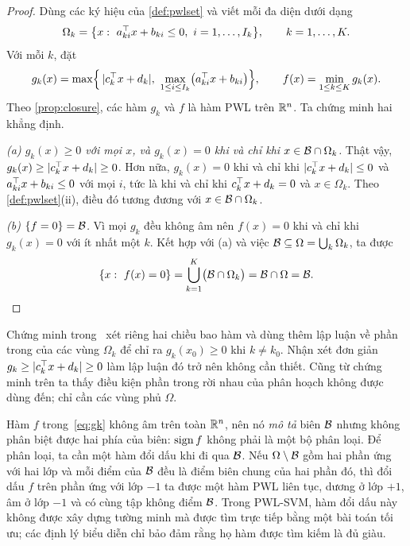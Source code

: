\begin{proof}
Dùng các ký hiệu của \cref{def:pwlset} và viết mỗi đa diện dưới dạng
\[
\Omega_k=\bigl\{x:\ a_{ki}^\T x+b_{ki}\le 0,\ i=1,\dots,I_k\bigr\},\qquad k=1,\dots,K .
\]
Với mỗi $k$, đặt
\begin{equation}\label{eq:gk}
g_k(x)=\max\Bigl\{\,|c_k^\top x+d_k|,\ \max_{1\le i\le I_k}\bigl(a_{ki}^\top x+b_{ki}\bigr)\Bigr\},
\qquad
f(x)=\min_{1\le k\le K} g_k(x).
\end{equation}
Theo \cref{prop:closure}, các hàm $g_k$ và $f$ là hàm PWL trên $\mathbb{R}^n$. Ta chứng minh hai khẳng định.

\emph{(a) $g_k(x)\ge0$ với mọi $x$, và $g_k(x)=0$ khi và chỉ khi $x\in\mathcal{B}\cap\Omega_k$.} Thật vậy, $g_k(x)\ge|c_k^\top x+d_k|\ge0$. Hơn nữa, $g_k(x)=0$ khi và chỉ khi $|c_k^\top x+d_k|\le0$ và $a_{ki}^\top x+b_{ki}\le0$ với mọi $i$, tức là khi và chỉ khi $c_k^\top x+d_k=0$ và $x\in\Omega_k$. Theo \cref{def:pwlset}(ii), điều đó tương đương với $x\in\mathcal{B}\cap\Omega_k$.

\emph{(b) $\{f=0\}=\mathcal{B}$.} Vì mọi $g_k$ đều không âm nên $f(x)=0$ khi và chỉ khi $g_k(x)=0$ với ít nhất một $k$. Kết hợp với (a) và việc $\mathcal{B}\subseteq\Omega=\bigcup_k\Omega_k$, ta được
\[
\{x:\ f(x)=0\}=\bigcup_{k=1}^{K}\bigl(\B\cap\Omega_k\bigr)=\B\cap\Omega=\B. \qedhere
\]
\end{proof}

\begin{remark}\label{rem:proof}
Chứng minh trong~\cite{huang2013} xét riêng hai chiều bao hàm và dùng thêm lập luận về phần trong của các vùng $\Omega_k$ để chỉ ra $g_k(x_0)\ge0$ khi $k\neq k_0$. Nhận xét đơn giản $g_k\ge|c_k^\top x+d_k|\ge0$ làm lập luận đó trở nên không cần thiết. Cũng từ chứng minh trên ta thấy điều kiện phần trong rời nhau của phân hoạch không được dùng đến; chỉ cần các vùng phủ $\Omega$.
\end{remark}

\begin{remark}\label{rem:nonneg}
Hàm $f$ trong~\eqref{eq:gk} không âm trên toàn $\mathbb{R}^n$, nên nó \emph{mô tả} biên $\mathcal{B}$ nhưng không phân biệt được hai phía của biên: $\operatorname{sign} f$ không phải là một bộ phân loại. Để phân loại, ta cần một hàm đổi dấu khi đi qua $\mathcal{B}$. Nếu $\Omega\setminus\mathcal{B}$ gồm hai phần ứng với hai lớp và mỗi điểm của $\mathcal{B}$ đều là điểm biên chung của hai phần đó, thì đổi dấu $f$ trên phần ứng với lớp $-1$ ta được một hàm PWL liên tục, dương ở lớp $+1$, âm ở lớp $-1$ và có cùng tập không điểm $\mathcal{B}$. Trong PWL-SVM, hàm đổi dấu này không được xây dựng tường minh mà được tìm trực tiếp bằng một bài toán tối ưu; các định lý biểu diễn chỉ bảo đảm rằng họ hàm được tìm kiếm là đủ giàu.
\end{remark}

